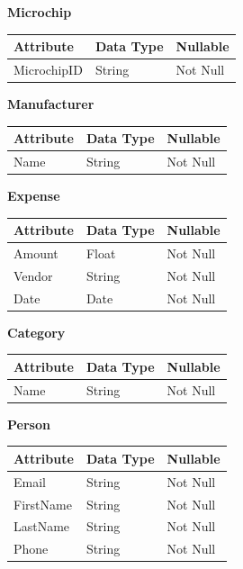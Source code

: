 \documentclass{article}
\begin{document}
\noindent \textbf{Microchip}
\begin{table}[H]
    \begin{tabular}{|l|l|l|}
    \hline
    \textbf{Attribute}        & \textbf{Data Type} & \textbf{Nullable} \\ \hline
    MicrochipID               & String            & Not Null          \\ \hline
    \end{tabular}
\end{table}

\noindent \textbf{Manufacturer}
\begin{table}[H]
    \begin{tabular}{|l|l|l|}
    \hline
    \textbf{Attribute}        & \textbf{Data Type} & \textbf{Nullable} \\ \hline
    Name                      & String             & Not Null          \\ \hline
    \end{tabular}
\end{table}

\noindent \textbf{Expense}
\begin{table}[H]
    \begin{tabular}{|l|l|l|}
    \hline
    \textbf{Attribute}   & \textbf{Data Type} & \textbf{Nullable} \\ \hline
    Amount               & Float              & Not Null          \\ \hline
    Vendor               & String             & Not Null          \\ \hline
    Date                 & Date               & Not Null          \\ \hline
    \end{tabular}
\end{table}

\noindent \textbf{Category}
\begin{table}[H]
    \begin{tabular}{|l|l|l|}
    \hline
    \textbf{Attribute}   & \textbf{Data Type} & \textbf{Nullable} \\ \hline
    Name               & String             & Not Null          \\ \hline
    \end{tabular}
\end{table}

\newpage
\noindent \textbf{Person}
\begin{table}[H]
    \begin{tabular}{|l|l|l|}
    \hline
    \textbf{Attribute} & \textbf{Data Type} & \textbf{Nullable} \\ \hline
    Email              & String             & Not Null          \\ \hline
    FirstName          & String             & Not Null          \\ \hline
    LastName           & String             & Not Null          \\ \hline
    Phone              & String             & Not Null          \\ \hline
    \end{tabular}
\end{table}
\end{document}
